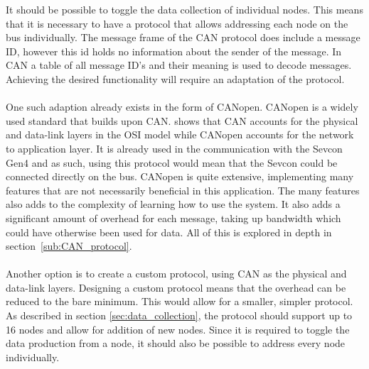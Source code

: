 It should be possible to toggle the data collection of individual nodes.
This means that it is necessary to have a protocol that allows addressing each node on the bus individually.
The message frame of the CAN protocol does include a message ID, however this id holds no information about the sender of the message.
In CAN a table of all message ID's and their meaning is used to decode messages.
Achieving the desired functionality will require an adaptation of the protocol. 
\\~\\
One such adaption already exists in the form of CANopen.
CANopen is a widely used standard that builds upon CAN.
\cite{CANopen_introduction} shows that CAN accounts for the physical and data-link layers in the OSI model while CANopen accounts for the network to application layer.
It is already used in the communication with the Sevcon Gen4 and as such, using this protocol would mean that the Sevcon could be connected directly on the bus.
CANopen is quite extensive, implementing many features that are not necessarily beneficial in this application.
The many features also adds to the complexity of learning how to use the system.
It also adds a significant amount of overhead for each message, taking up bandwidth which could have otherwise been used for data. 
All of this is explored in depth in section~\ref{sub:CAN_protocol}.
\\~\\
Another option is to create a custom protocol, using CAN as the physical and data-link layers.
Designing a custom protocol means that the overhead can be reduced to the bare minimum.
This would allow for a smaller, simpler protocol.
As described in section \ref{sec:data_collection}, the protocol should support up to 16 nodes and allow for addition of new nodes.
Since it is required to toggle the data production from a node, it should also be possible to address every node individually.
